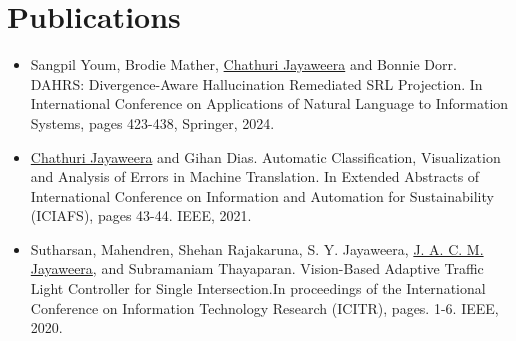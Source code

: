 \documentclass[a4paper,11pt]{article}
\begin{document}
\begin{tabular}{r|p{17.5cm}}
  
\end{tabular}

\section{Publications}
\begin{itemize}
\setlength\itemsep{0.01em}
  \item Sangpil Youm, Brodie Mather, \underline{Chathuri Jayaweera} and Bonnie Dorr. DAHRS: Divergence-Aware Hallucination Remediated SRL Projection. In International Conference on Applications of Natural Language to Information Systems, pages 423-438, Springer, 2024.
  \item \underline{Chathuri Jayaweera} and Gihan Dias. Automatic Classification, Visualization and Analysis of Errors in Machine Translation. In Extended Abstracts of International Conference on Information and Automation for Sustainability (ICIAFS), pages 43-44. IEEE, 2021.
  \item Sutharsan, Mahendren, Shehan Rajakaruna, S. Y. Jayaweera, \underline{J. A. C. M. Jayaweera}, and Subramaniam Thayaparan. Vision-Based Adaptive Traffic Light Controller for Single Intersection.In proceedings of the International Conference on Information Technology Research (ICITR), pages. 1-6. IEEE, 2020.
\end{itemize}
\end{document}
